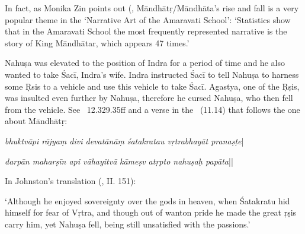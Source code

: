 {{ 
  In fact, as Monika Zin points out {\rm (},
  Māndhātṛ/Māndhāta's rise and fall is a very popular theme
  in the `Narrative Art of the Amaravati School': 
  `Statistics show that in the Amaravati School the most frequently represented narrative is
  the story of King Māndhātar, which appears 47 times.'
  
  
 
  Nahuṣa was elevated to the position of Indra for a period of time and he also wanted
  to take Śacī, Indra's wife. Indra instructed Śacī to tell Nahuṣa to 
  harness some Ṛsis to a vehicle and use this vehicle to take Śacī. 
  Agastya, one of the Ṛṣis, was insulted even further by Nahuṣa, therefore
  he cursed Nahuṣa, who then fell from the vehicle. See \MBH\ 12.329.35ff and
  a verse in the \BUDDHACARITA\ {\rm (}11.14{\rm )} that follows the one about Māndhātṛ:
  
 
  \textit{bhuktvāpi rājyaṃ divi devatānāṃ} 
  \textit{śatakratau vṛtrabhayāt pranaṣṭe}\thinspace | 
 
  \textit{darpān maharṣīn api vāhayitvā} 
  \textit{kāmeṣv atṛpto nahuṣaḥ papāta}\thinspace ||
  
 
  In Johnston's translation {\rm (}\citeyear{Buddhacarita}, II. 151{\rm )}:
  
 
  `Although he enjoyed sovereignty over the gods in heaven, when Śatakratu hid himself
  for fear of Vṛtra, and though out of wanton pride he made the great ṛṣis carry him,
  yet Nahuṣa fell, being still unsatisfied with the passions.'
 }}


